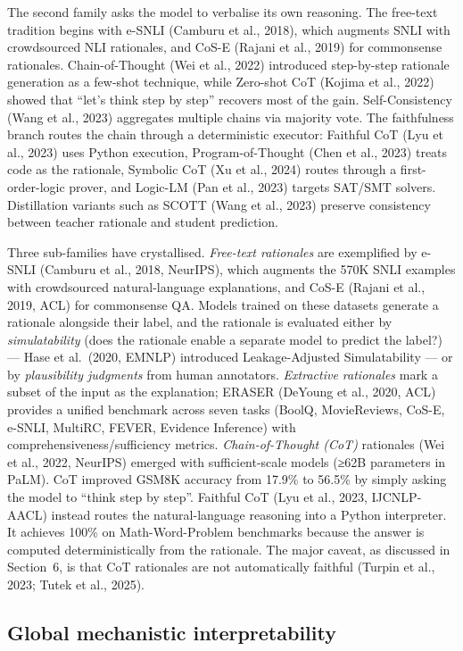The second family asks the model to verbalise its own reasoning. The free-text tradition begins with e-SNLI (Camburu et al., 2018), which augments SNLI with crowdsourced NLI rationales, and CoS-E (Rajani et al., 2019) for commonsense rationales. Chain-of-Thought (Wei et al., 2022) introduced step-by-step rationale generation as a few-shot technique, while Zero-shot CoT (Kojima et al., 2022) showed that ``let's think step by step'' recovers most of the gain. Self-Consistency (Wang et al., 2023) aggregates multiple chains via majority vote. The faithfulness branch routes the chain through a deterministic executor: Faithful CoT (Lyu et al., 2023) uses Python execution, Program-of-Thought (Chen et al., 2023) treats code as the rationale, Symbolic CoT (Xu et al., 2024) routes through a first-order-logic prover, and Logic-LM (Pan et al., 2023) targets SAT/SMT solvers. Distillation variants such as SCOTT (Wang et al., 2023) preserve consistency between teacher rationale and student prediction.

Three sub-families have crystallised. \emph{Free-text rationales} are exemplified by e-SNLI (Camburu et al., 2018, NeurIPS), which augments the 570K SNLI examples with crowdsourced natural-language explanations, and CoS-E (Rajani et al., 2019, ACL) for commonsense QA. Models trained on these datasets generate a rationale alongside their label, and the rationale is evaluated either by \emph{simulatability} (does the rationale enable a separate model to predict the label?) --- Hase et al.~(2020, EMNLP) introduced Leakage-Adjusted Simulatability --- or by \emph{plausibility judgments} from human annotators. \emph{Extractive rationales} mark a subset of the input as the explanation; ERASER (DeYoung et al., 2020, ACL) provides a unified benchmark across seven tasks (BoolQ, MovieReviews, CoS-E, e-SNLI, MultiRC, FEVER, Evidence Inference) with comprehensiveness/sufficiency metrics. \emph{Chain-of-Thought (CoT)} rationales (Wei et al., 2022, NeurIPS) emerged with sufficient-scale models (≥62B parameters in PaLM). CoT improved GSM8K accuracy from 17.9\% to 56.5\% by simply asking the model to ``think step by step''. Faithful CoT (Lyu et al., 2023, IJCNLP-AACL) instead routes the natural-language reasoning into a Python interpreter. It achieves 100\% on Math-Word-Problem benchmarks because the answer is computed deterministically from the rationale. The major caveat, as discussed in Section~6, is that CoT rationales are not automatically faithful (Turpin et al., 2023; Tutek et al., 2025).

\subsection{Global mechanistic interpretability}\label{global-mechanistic-interpretability}

